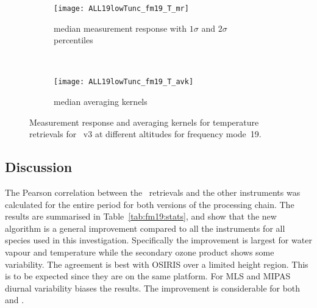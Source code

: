 \begin{figure}[tbhp]
    \centering
    \begin{subfigure}[b]{0.49\textwidth}
        \texttt{[image: ALL19lowTunc\_fm19\_T\_mr]}
        \caption{median measurement response with $1\sigma$ and $2\sigma$
        percentiles}
        \label{fig:fm19:T:mr}
    \end{subfigure}
    \,
    \begin{subfigure}[b]{0.49\textwidth}
        \texttt{[image: ALL19lowTunc\_fm19\_T\_avk]}
        \caption{median averaging kernels\newline~}
        \label{fig:fm19:T:avk}
    \end{subfigure}
    \caption{Measurement response and averaging kernels for temperature
    retrievals for \smr~v3 at different altitudes for frequency mode~19.}
    \label{fig:fm19:T:mr_avk}
\end{figure}


\subsection{Discussion}
\label{sec:fm19:discussion}
The Pearson correlation between the \smr\ retrievals and the other instruments
was calculated for the entire period for both versions of the processing chain.
The results are summarised in Table~\ref{tab:fm19:stats}, and show that the
new algorithm is a general improvement compared to all the instruments for all
species used in this investigation. Specifically the improvement is largest for
water vapour and temperature while the secondary ozone product shows some
variability. The agreement is best with OSIRIS over a limited height region.
This is to be expected since they are on the same platform. For MLS and MIPAS
diurnal variability biases the results.  The improvement is considerable for
both  and .


